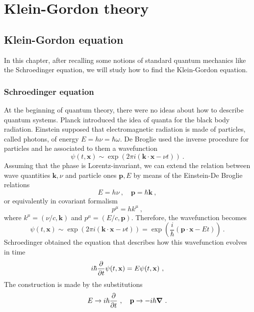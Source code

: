 \part{Klein-Gordon theory}

\chapter{Klein-Gordon equation}

    In this chapter, after recalling some notions of standard quantum mechanics like the Schroedinger equation, we will study how to find the Klein-Gordon equation.

\section{Schroedinger equation}

    At the beginning of quantum theory, there were no ideas about how to describe quantum systems. Planck introduced the idea of quanta for the black body radiation. Einstein supposed that electromagnetic radiation is made of particles, called photons, of energy $E = h \nu = \hbar \omega$. De Broglie used the inverse procedure for particles and he associated to them a wavefunction 
    \begin{equation*}
        \psi (t, \mathbf x) \sim \exp(2 \pi i ( \mathbf k \cdot \mathbf x - \nu t)) ~.
    \end{equation*}
    Assuming that the phase is Lorentz-invariant, we can extend the relation between wave quantities $\mathbf k, \nu$ and particle ones $\mathbf p, E$ by means of the Einstein-De Broglie relations 
    \begin{equation*}
        E = h \nu ~, \quad \mathbf p = \hbar \mathbf k ~,
    \end{equation*}
    or equivalently in covariant formalism 
    \begin{equation*}
        p^\mu = h k^\mu ~,
    \end{equation*}
    where $k^\mu = (\nu / c, \mathbf k)$ and $p^\mu = (E / c, \mathbf p)$. Therefore, the wavefunction becomes 
    \begin{equation*}
        \psi(t, \mathbf x) \sim \exp(2\pi i (\mathbf k \cdot \mathbf x - \nu t)) = \exp(\frac{i}{\hbar} (\mathbf p \cdot \mathbf x - E t)) ~.
    \end{equation*}
    Schroedinger obtained the equation that describes how this wavefunction evolves in time 
    \begin{equation}\label{schro}
        i \hbar \frac{\partial}{\partial t} \psi(t, \mathbf x) = E \psi(t, \mathbf x) ~,
    \end{equation}
    The construction is made by the substitutions 
    \begin{equation}\label{subst}
        E \rightarrow i \hbar \frac{\partial}{\partial t} ~, \quad \mathbf p \rightarrow - i \hbar \boldsymbol \nabla ~.
    \end{equation}

